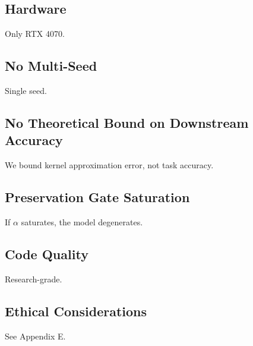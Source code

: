 \subsection{Hardware}

Only RTX 4070.

\subsection{No Multi-Seed}

Single seed.

\subsection{No Theoretical Bound on Downstream Accuracy}

We bound kernel approximation error, not task accuracy.

\subsection{Preservation Gate Saturation}

If $\alpha$ saturates, the model degenerates.

\subsection{Code Quality}

Research-grade.

\subsection{Ethical Considerations}

See Appendix E.


